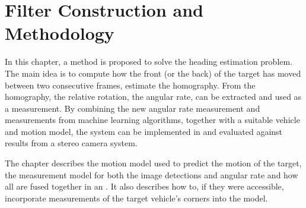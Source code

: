 \chapter{Filter Construction and Methodology}
\label{cha:method}

In this chapter, a method is proposed to solve the heading estimation problem.
The main idea is to compute how the front (or the back) of the target has moved between two consecutive frames, \ie estimate the homography.
From the homography, the relative rotation, \ie the angular rate, can be extracted and used as a measurement.
By combining the new angular rate measurement and \abbrROI measurements from machine learning algorithms, together with a suitable vehicle and motion model, the system can be implemented in \matlab and evaluated against results from a stereo camera system.

The chapter describes the motion model used to predict the motion of the target, the measurement model for both the image detections and angular rate and how all are fused together in an \abbrEKF.
It also describes how to, if they were accessible, incorporate measurements of the target vehicle's corners into the model.

